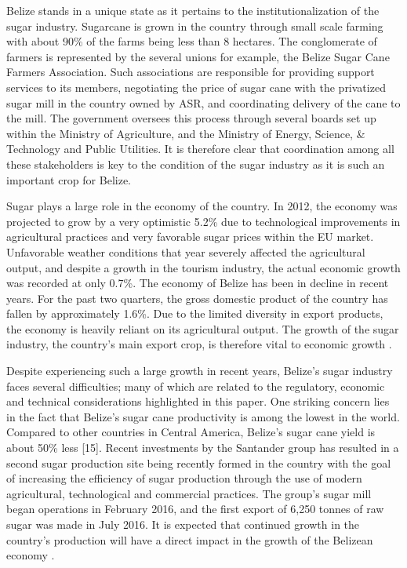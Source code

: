 \documentclass[twocolumn,10pt]{asme2e}
\begin{document}
Belize stands in a unique state as it pertains to the institutionalization of the sugar industry. Sugarcane is grown in the country through small scale farming with about 90\% of the farms being less than 8 hectares. The conglomerate of farmers is represented by the several unions for example, the Belize Sugar Cane Farmers Association. Such associations are responsible for providing support services to its members, negotiating the price of sugar cane with the privatized sugar mill in the country owned by ASR, and coordinating delivery of the cane to the mill. The government oversees this process through several boards set up within the Ministry of Agriculture, and the Ministry of Energy, Science, \& Technology and Public Utilities. It is therefore clear that coordination among all these stakeholders is key to the condition of the sugar industry as it is such an important crop for Belize\cite{asr_report}.

Sugar plays a large role in the economy of the country. In 2012, the economy was projected to grow by a very optimistic 5.2\% due to technological improvements in agricultural practices and very favorable sugar prices within the EU market. Unfavorable weather conditions that year severely affected the agricultural output, and despite a growth in the tourism industry, the actual economic growth was recorded at only 0.7\%. The economy of Belize has been in decline in recent years. For the past two quarters, the gross domestic product of the country has fallen by approximately 1.6\%. Due to the limited diversity in export products, the economy is heavily reliant on its agricultural output. The growth of the sugar industry, the country's main export crop, is therefore vital to economic growth \cite{asr_report}. 

Despite experiencing such a large growth in recent years, Belize's sugar industry faces several difficulties; many of which are related to the regulatory, economic and technical considerations highlighted in this paper. One striking concern lies in the fact that Belize's sugar cane productivity is among the lowest in the world. Compared to other countries in Central America, Belize's sugar cane yield is about 50\% less [15]. 
Recent investments by the Santander group has resulted in a second sugar production site being recently formed in the country with the goal of increasing the efficiency of sugar production through the use of modern agricultural, technological and commercial practices. The group's sugar mill began operations in February 2016, and the first export of 6,250 tonnes of raw sugar was made in July 2016. It is expected that continued growth in the country's production will have a direct impact in the growth of the Belizean economy \cite{santander_flex}.
\end{document}
